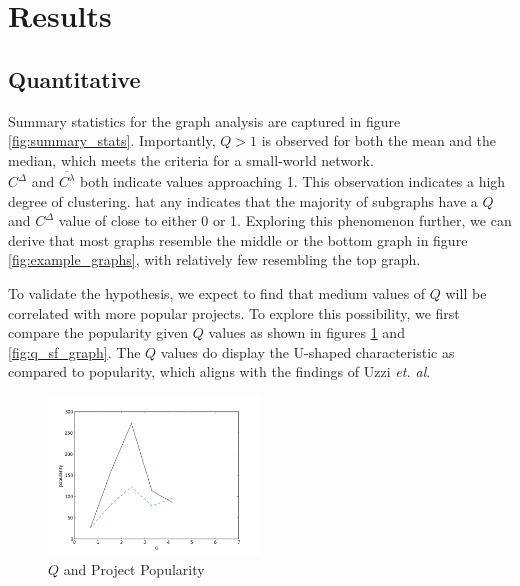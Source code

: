 \documentclass{proc}
\begin{document}
\section{Results}

\subsection{Quantitative}




Summary statistics for the graph analysis are captured in figure \ref{fig:summary_stats}. Importantly, $Q > 1$ is observed for both the mean and the median, which meets the criteria for a small-world network\cite{humphries2008network}.\\

$C^\Delta$ and $\overline{C^\lambda}$ both indicate values approaching 1. This observation indicates a high degree of clustering\cite{watts1998collective}. hat any indicates that the majority of subgraphs have a $Q$ and $C^\Delta$ value of close to either 0 or 1. Exploring this phenomenon further, we can derive that most graphs resemble the middle or the bottom graph in figure \ref{fig:example_graphs}, with relatively few resembling the top graph.

To validate the hypothesis, we expect to find that medium values of $Q$ will be correlated with more popular projects. To explore this possibility, we first compare the popularity given $Q$ values as shown in figures \ref{fig:q_fc_graph} and \ref{fig:q_sf_graph}. The $Q$ values do display the U-shaped characteristic as compared to popularity, which aligns with the findings of Uzzi \textit{et. al}\cite{uzzi2005collaboration}.

\begin{figure}
\begin{center}
\includegraphics[width=0.5\textwidth]{images/freecode-graph.png}
\end{center}
\caption{$Q$ and Project Popularity}
\label{fig:q_fc_graph}
\end{figure}
\end{document}
